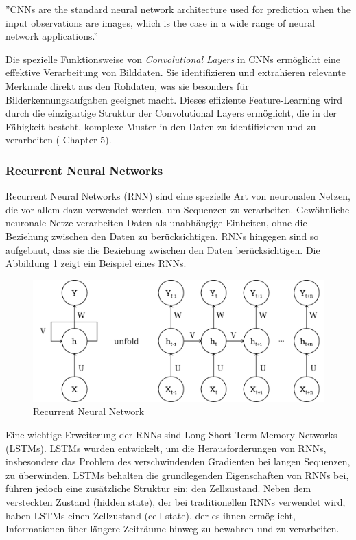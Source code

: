 \documentclass[11pt,a4paper]{article}
\begin{document}
\begin{displayquote}
	''CNNs are the standard neural network architecture used for prediction when the input
	observations are images, which is the case in a wide range of neural network applications.''
\end{displayquote}

\noindent
Die spezielle Funktionsweise von \textit{Convolutional Layers} in CNNs ermöglicht eine effektive 
Verarbeitung von Bilddaten. Sie identifizieren und extrahieren relevante Merkmale direkt aus den 
Rohdaten, was sie besonders für Bilderkennungsaufgaben geeignet macht. Dieses effiziente 
Feature-Learning wird durch die einzigartige Struktur der Convolutional Layers ermöglicht, die in 
der Fähigkeit besteht, komplexe Muster in den Daten zu identifizieren und zu verarbeiten 
(\cite{weidman2019deep} Chapter 5). 

\subsubsection{Recurrent Neural Networks}
Recurrent Neural Networks (RNN) sind eine spezielle Art von neuronalen Netzen, die vor allem dazu 
verwendet werden, um Sequenzen zu verarbeiten. Gewöhnliche neuronale Netze verarbeiten Daten als 
unabhängige Einheiten, ohne die Beziehung zwischen den Daten zu berücksichtigen. RNNs hingegen sind 
so aufgebaut, dass sie die Beziehung zwischen den Daten berücksichtigen. Die Abbildung \ref{fig:rnn} 
zeigt ein Beispiel eines RNNs.

\begin{figure}[h]
	\centering
	\includegraphics[width=0.8\linewidth]{img/rnn.pdf}
	\caption{Recurrent Neural Network}
	\label{fig:rnn}
\end{figure}

\noindent \newline
Eine wichtige Erweiterung der RNNs sind Long Short-Term Memory Networks (LSTMs). LSTMs wurden 
entwickelt, um die Herausforderungen von RNNs, insbesondere das Problem des verschwindenden 
Gradienten bei langen Sequenzen, zu überwinden. LSTMs behalten die grundlegenden Eigenschaften von 
RNNs bei, führen jedoch eine zusätzliche Struktur ein: den Zellzustand. Neben dem versteckten 
Zustand (hidden state), der bei traditionellen RNNs verwendet wird, haben LSTMs einen Zellzustand 
(cell state), der es ihnen ermöglicht, Informationen über längere Zeiträume hinweg zu bewahren und 
zu verarbeiten.
\end{document}
